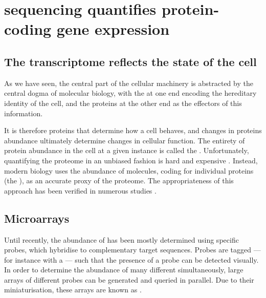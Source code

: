 \section{ sequencing quantifies protein-coding gene expression}

\subsection{The transcriptome reflects the state of the cell}

As we have seen, the central part of the cellular machinery is abstracted by the
central dogma of molecular biology, with the \dna at one end encoding the
hereditary identity of the cell, and the proteins at the other end as the
effectors of this information.

It is therefore proteins that determine how a cell behaves, and changes in
proteins abundance ultimately determine changes in cellular function. The
entirety of protein abundance in the cell at a given instance is called the
. Unfortunately, quantifying the proteome in an unbiased
fashion is hard and expensive \citep{Graumann:2008}. Instead, modern biology
uses the abundance of \mrna molecules, coding for individual proteins (the
), as an accurate proxy of the proteome.
The appropriateness of this approach has been verified in numerous
studies \citep{Nagaraj:2011,Nookaew:2012}.

\subsection{Microarrays}

Until recently, the abundance of \mrna has been mostly determined using specific
probes, which hybridise to complementary target \mrna sequences. Probes are
tagged --- for instance with a  ---
such that the presence of a probe can be detected visually. In order to
determine the abundance of many different \mrna[s] simultaneously, large arrays
of different probes can be generated and queried in parallel. Due to their
miniaturisation, these arrays are known as 
\citep{Schena:1995}.

